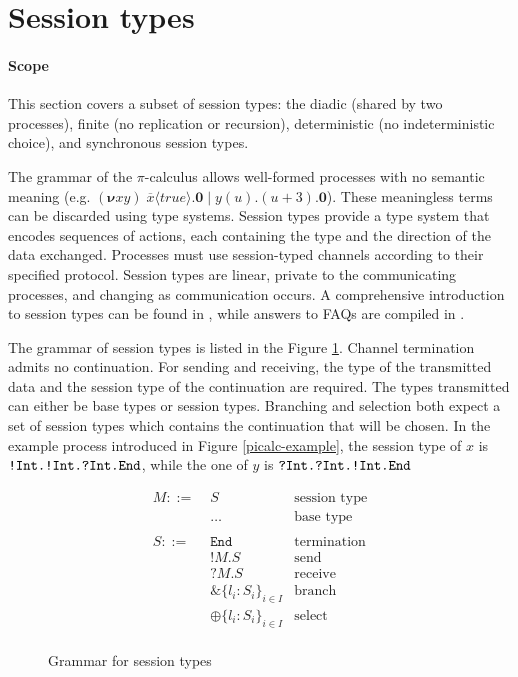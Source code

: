\documentclass{mproj}
\newcommand{\PO}{\mathbf{0}}
\newcommand{\comp}[2]{#1 \mid #2}
\newcommand{\new}[2]{(\boldsymbol{\nu} #1 #2) \;}
\newcommand{\cout}[2]{\overline{#1}\langle#2\rangle.}
\newcommand{\cin}[2]{#1(#2).}
\newcommand{\picalc}{$\pi$-calculus}
\newcommand{\type}{\texttt}
\newcommand{\End}{\type{End}}
\newcommand{\Send}[1]{!#1.}
\newcommand{\Recv}[1]{?#1.}
\newcommand{\Select}{\oplus}
\newcommand{\Branch}{\&}
\begin{document}
\section{Session types}\label{session-types}

\paragraph{Scope} This section covers a subset of session types: the diadic (shared by two processes), finite (no replication or recursion), deterministic (no indeterministic choice), and synchronous session types.

The grammar of the \picalc{} allows well-formed processes with no semantic meaning (e.g. $\new{x}{y} \comp {\cout{x}{true}\PO} {\cin{y}{u}(u+3).\PO}$). These meaningless terms can be discarded using type systems. Session types \cite{Honda1993, Takeuchi1994, Honda1998} provide a type system that encodes sequences of actions, each containing the type and the direction of the data exchanged. Processes must use session-typed channels according to their specified protocol. Session types are linear, private to the communicating processes, and changing as communication occurs. A comprehensive introduction to session types can be found in \cite{Vasconcelos2009}, while answers to FAQs are compiled in \cite{Dezani-ciancaglini2010}.

The grammar of session types is listed in the Figure \ref{session-types-grammar}. Channel termination admits no continuation. For sending and receiving, the type of the transmitted data and the session type of the continuation are required. The types transmitted can either be base types or session types. Branching and selection both expect a set of session types which contains the continuation that will be chosen. In the example process introduced in Figure \ref{picalc-example}, the session type of $x$ is $\type{\Send{Int}\Send{Int}\Recv{Int}\End}$, while the one of $y$ is $\type{\Recv{Int}\Recv{Int}\Send{Int}\End}$

\begin{figure}[H]
    \begin{align*}
        M ::= \; &S                               & \text{session type}\\
                 &\ldots                          & \text{base type} \\
                 \\
        S ::= \; &\type{End}                      & \text{termination} \\
                 &\Send{M}S                       & \text{send} \\
                 &\Recv{M}S                       & \text{receive} \\
                 &\Branch \{l_i : S_i\}_{i \in I} & \text{branch} \\
                 &\Select \{l_i : S_i\}_{i \in I} & \text{select} \\
    \end{align*}
    \caption{Grammar for session types}
    \label{session-types-grammar}
\end{figure}
\end{document}
